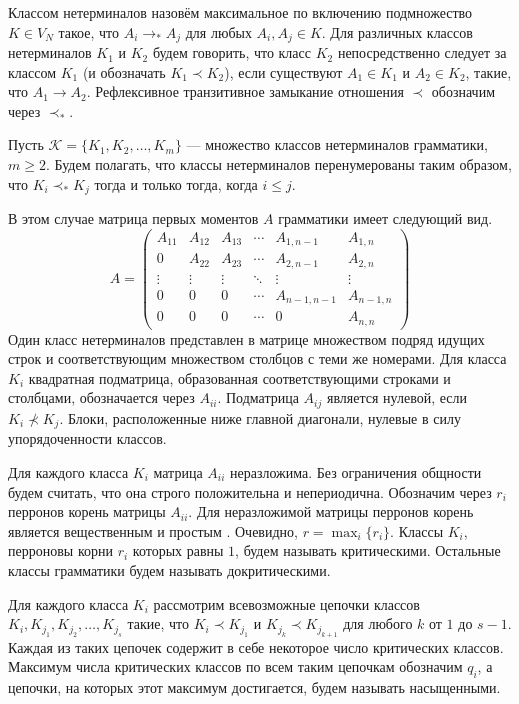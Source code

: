 \documentclass{article}
\renewcommand{\leq}{\leqslant}
\begin{document}
Классом нетерминалов назовём максимальное по включению подмножество $K \in V_N$ такое, что $A_i \rightarrow_* A_j$ для любых $A_i, A_j \in K$. Для различных классов нетерминалов $K_1$ и $K_2$ будем говорить, что класс $K_2$ непосредственно следует за классом $K_1$ (и обозначать $K_1 \prec K_2$), если существуют $A_1 \in K_1$ и $A_2 \in K_2$, такие, что $A_1 \rightarrow A_2$. Рефлексивное транзитивное замыкание отношения $\prec$ обозначим через $\prec_*$.

Пусть $\mathcal{K} = \{ K_1, K_2, \ldots, K_m \}$ --- множество классов нетерминалов грамматики, $m \geqslant 2$. Будем полагать, что классы нетерминалов перенумерованы таким образом, что $K_i \prec_* K_j$ тогда и только тогда, когда $i \leq j$.

В этом случае матрица первых моментов $A$ грамматики имеет следующий вид.
\begin{equation}
\label{eq:matrix}
    A = 
    \begin{pmatrix}
        A_{11} & A_{12} & A_{13} & \cdots & A_{1,n-1} & A_{1,n} \\
        0 & A_{22} & A_{23} & \cdots & A_{2,n-1} & A_{2,n} \\
        \vdots & \vdots & \vdots & \ddots & \vdots & \vdots \\
        0 & 0 & 0 & \cdots & A_{n-1,n-1} & A_{n-1,n} \\
        0 & 0 & 0 & \cdots & 0 & A_{n,n}
    \end{pmatrix}
\end{equation}
Один класс нетерминалов представлен в матрице множеством подряд идущих строк и соответствующим множеством столбцов с теми же номерами. Для класса $K_i$ квадратная подматрица, образованная соответствующими строками и столбцами, обозначается через $A_{ii}$. Подматрица $A_{ij}$ является нулевой, если $K_i \nprec K_j$. Блоки, расположенные ниже главной диагонали, нулевые в силу упорядоченности классов.

Для каждого класса $K_i$ матрица $A_{ii}$ неразложима. Без ограничения общности будем считать, что она строго положительна и непериодична. Обозначим через $r_i$ перронов корень матрицы $A_{ii}$. Для неразложимой матрицы перронов корень является вещественным и простым \cite{gantmaher}. Очевидно, $r = \max_i \{ r_i \}$. Классы $K_i$, перроновы корни $r_i$ которых равны $1$, будем называть критическими. Остальные классы грамматики будем называть докритическими.

Для каждого класса $K_i$ рассмотрим всевозможные цепочки классов $K_i, K_{j_1}, K_{j_2}, \ldots, K_{j_s}$ такие, что $K_i \prec K_{j_1}$ и $K_{j_k} \prec K_{j_{k+1}}$ для любого $k$ от $1$ до $s-1$. Каждая из таких цепочек содержит в себе некоторое число критических классов. Максимум числа критических классов по всем таким цепочкам обозначим $q_i$, а цепочки, на которых этот максимум достигается, будем называть насыщенными.
\end{document}
